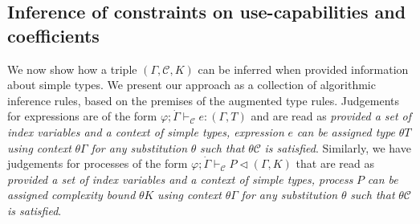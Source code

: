 



\subsection{Inference of constraints on use-capabilities and coefficients}

We now show how a triple $(\Gamma,\mathcal{C},K)$ can be inferred when provided information about simple types. We present our approach as a collection of algorithmic inference rules, based on the premises of the augmented type rules. Judgements for expressions are of the form $\varphi;\dot{\Gamma}\vdash_{\mathcal{C}} e : (\Gamma, T)$ and are read as \textit{provided a set of index variables and a context of simple types, expression} $e$ \textit{can be assigned type} $\theta T$ \textit{using context} $\theta\Gamma$ \textit{for any substitution} $\theta$ \textit{such that} $\theta\mathcal{C}$ \textit{is satisfied}. Similarly, we have judgements for processes of the form $\varphi;\dot{\Gamma}\vdash_{\mathcal{C}} P \triangleleft (\Gamma,K)$ that are read as \textit{provided a set of index variables and a context of simple types, process} $P$ \textit{can be assigned complexity bound} $\theta K$ \textit{using context} $\theta\Gamma$ \textit{for any substitution} $\theta$ \textit{such that} $\theta\mathcal{C}$ \textit{is satisfied}. \\ %

